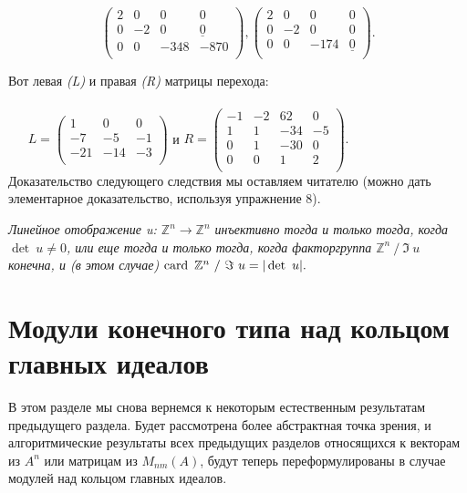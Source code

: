 $$\begin{pmatrix} 
2 & 0 & 0 & 0 \\
0 & -2 & 0 & \underline{0} \\ 
0 & 0 & -348 & -870 \\ \end{pmatrix},  
\begin{pmatrix} 
2 & 0 & 0 & 0 \\
0 & -2 & 0 & 0 \\ 
0 & 0 & -174 & \underline{0}\\ \end{pmatrix}.$$

\noindent Вот левая \textit{(L)} и правая \textit{(R)} матрицы перехода:\\\\
$~~~~~~~ L = \begin{pmatrix} 
1 & 0 & 0 \\
-7 & -5 & -1 \\ 
-21 & -14 & -3 \\ \end{pmatrix} $
и  
$ R = \begin{pmatrix} 
-1 & -2 & 62 & 0 \\
1 & 1 & -34 & -5 \\ 
0 & 1 & -30 & 0 \\ 
0 & 0 & 1 & 2 \\
\end{pmatrix}.$
\\


Доказательство следующего следствия мы оставляем читателю (можно дать элементарное доказательство, используя упражнение 8). \\
\begin{sled}
\hspace*{0.5cm}
\textit{Линейное отображение u: $ \mathbb{Z}^{n} \rightarrow \mathbb{Z}^{n} $ инъективно тогда и только тогда, когда $ \det~u \ne 0$, или еще тогда и только тогда, когда факторгруппа
$ \mathbb{Z}^{n} ~/~ \Im~u $ конечна, и (в этом случае) $ \operatorname{card}~ \mathbb{Z}^{n} ~/~ \Im~u = |\det~u|.$} \end{sled}

\section{Модули конечного типа над кольцом главных идеалов}

В этом разделе мы снова вернемся к некоторым естественным результатам предыдущего раздела. Будет рассмотрена более абстрактная точка зрения, и алгоритмические результаты всех предыдущих разделов относящихся к векторам из $A^{n}$ или матрицам из $M_{n m}(A)$, будут теперь переформулированы в случае модулей над кольцом главных идеалов.


